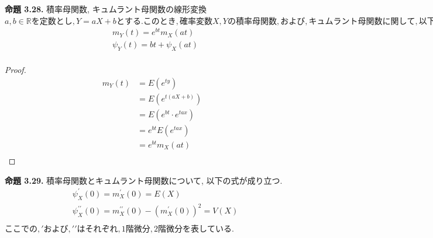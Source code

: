 \documentclass[dvipdfmx,10pt, a4j]{jarticle}
\theoremstyle{definition}
\begin{document}
\noindent
\textbf{命題 3.28.} 積率母関数, キュムラント母関数の線形変換\\
$a, b \in \mathbb{R} を定数とし, Y = aX+b とする. このとき, 確率変数X, Yの積率母関数, および, キュムラント母関数に関して, 以下が成り立つ.$\\
\begin{align*}
     & m_Y(t) =e^{bt}m_X(at)      \\
     & \psi_Y(t) =bt + \psi_X(at) \\
\end{align*}
\begin{proof}
    \begin{align*}
        m_Y(t) & = E(e^{ty})               \\
               & = E(e^{t(aX + b)})        \\
               & = E(e^{bt} \cdot e^{tax}) \\
               & = e^{bt} E(e^{tax})       \\
               & = e^{bt} m_X(at)          \\
    \end{align*}
\end{proof}

\noindent
\textbf{命題 3.29.} 積率母関数とキュムラント母関数について, 以下の式が成り立つ.\\
\begin{align*}
     & \psi_X^{\prime}(0) = m_X^{\prime}(0) = E(X)                                     \\
     & \psi_X^{\prime \prime}(0) = m_X^{\prime \prime}(0) - (m_X^{\prime}(0))^2 = V(X) \\
\end{align*}
$ここでの, \prime および, \prime \prime はそれぞれ, 1階微分, 2階微分を表している.$\\
\end{document}
